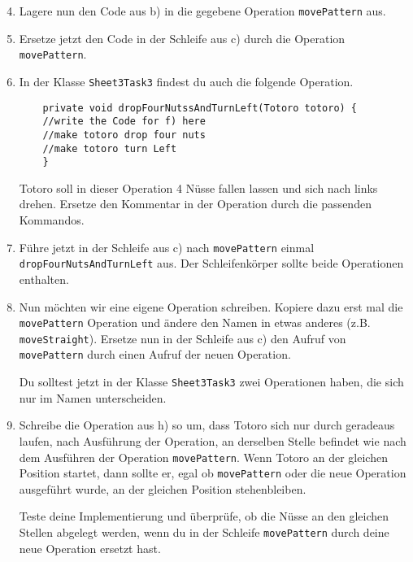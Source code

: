 \begin{enumerate}\setcounter{enumi}{3}
	\item
	Lagere nun den Code aus b) in die gegebene Operation \lstinline{movePattern} aus.

	\item
	Ersetze jetzt den Code in der Schleife aus c) durch die Operation \lstinline{movePattern}.
	
	\item
	In der Klasse \lstinline{Sheet3Task3} findest du auch die folgende Operation.
	
	\begin{lstlisting}
	private void dropFourNutssAndTurnLeft(Totoro totoro) {
	//write the Code for f) here
	//make totoro drop four nuts
	//make totoro turn Left
	}
	\end{lstlisting}
	
	Totoro soll in dieser Operation 4 Nüsse fallen lassen und sich nach links drehen.
	Ersetze den Kommentar in der Operation durch die passenden Kommandos.
	
	\item
	Führe jetzt in der Schleife aus c) nach \lstinline{movePattern} einmal \lstinline{dropFourNutsAndTurnLeft} aus.
	Der Schleifenkörper sollte beide Operationen enthalten.
	
	\item
	Nun möchten wir eine eigene Operation schreiben.
	Kopiere dazu erst mal die \lstinline{movePattern} Operation und ändere den Namen in etwas anderes (z.B. \lstinline{moveStraight}).
	Ersetze nun in der Schleife aus c) den Aufruf von \lstinline{movePattern} durch einen Aufruf der neuen Operation.
	
	Du solltest jetzt in der Klasse \lstinline{Sheet3Task3} zwei Operationen haben, die sich nur im Namen unterscheiden.
	
	\item
	Schreibe die Operation aus h) so um, dass Totoro sich nur durch geradeaus laufen, nach Ausführung der Operation, an derselben Stelle befindet wie nach dem Ausführen der Operation \lstinline{movePattern}.
	Wenn Totoro an der gleichen Position startet, dann sollte er, egal ob \lstinline{movePattern} oder die neue Operation ausgeführt wurde, an der gleichen Position stehenbleiben.
	
	Teste deine Implementierung und überprüfe, ob die Nüsse an den gleichen Stellen abgelegt werden, wenn du in der Schleife \lstinline{movePattern} durch deine neue Operation ersetzt hast.
\end{enumerate}
\newpage
